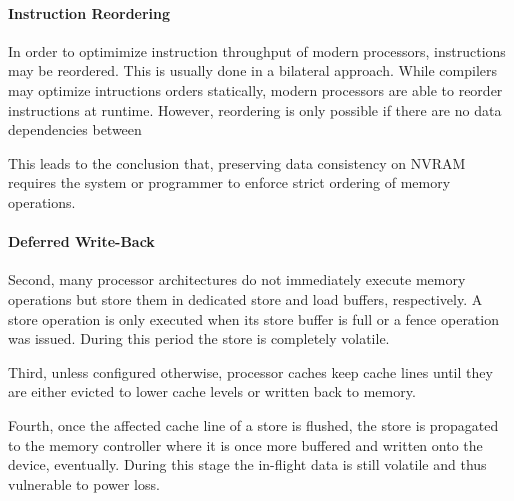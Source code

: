 

\paragraph{Instruction Reordering}


In order to optimimize instruction throughput of modern processors, instructions may be reordered. This is usually done in a bilateral approach. While compilers may optimize intructions orders statically, modern processors are able to reorder instructions at runtime. However, reordering is only possible if there are no data dependencies between


This leads to the conclusion that, preserving data consistency on NVRAM requires the system or programmer to enforce strict ordering of memory operations.

\paragraph{Deferred Write-Back}


Second, many processor architectures do not immediately execute memory
operations but store them in dedicated store and load buffers, respectively. A
store operation is only executed when its store buffer is full or a fence
operation was issued. During this period the store is completely volatile.

Third, unless configured otherwise, processor caches keep cache lines until they
are either evicted to lower cache levels or written back to memory.

Fourth, once the affected cache line of a store is flushed, the store is
propagated to the memory controller where it is once more buffered and written
onto the device, eventually. During this stage the in-flight data is still
volatile and thus vulnerable to power loss.

